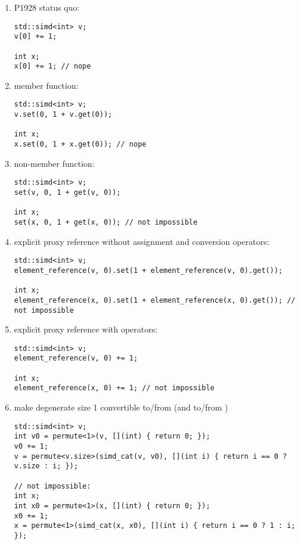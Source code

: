 \begin{enumerate}
  \item P1928 status quo:\label{explP1928}
\medskip\begin{lstlisting}[style=Vc]
std::simd<int> v;
v[0] += 1;

int x;
x[0] += 1; // nope
\end{lstlisting}

\item {} member function:\label{memberset}
\medskip\begin{lstlisting}[style=Vc]
std::simd<int> v;
v.set(0, 1 + v.get(0));

int x;
x.set(0, 1 + x.get(0)); // nope
\end{lstlisting}

\item {} non-member function:\label{nonmemberset}
\medskip\begin{lstlisting}[style=Vc]
std::simd<int> v;
set(v, 0, 1 + get(v, 0));

int x;
set(x, 0, 1 + get(x, 0)); // not impossible
\end{lstlisting}

\item explicit proxy reference without assignment and conversion operators:\label{proxyset}
\medskip\begin{lstlisting}[style=Vc]
std::simd<int> v;
element_reference(v, 0).set(1 + element_reference(v, 0).get());

int x;
element_reference(x, 0).set(1 + element_reference(x, 0).get()); // not impossible
\end{lstlisting}

\item explicit proxy reference with operators:\label{proxyoperators}
\medskip\begin{lstlisting}[style=Vc]
std::simd<int> v;
element_reference(v, 0) += 1;

int x;
element_reference(x, 0) += 1; // not impossible
\end{lstlisting}

\item make degenerate size 1 \simdT convertible to/from  (and \mask to/from )
  \medskip\begin{lstlisting}[style=Vc]
std::simd<int> v;
int v0 = permute<1>(v, [](int) { return 0; });
v0 += 1;
v = permute<v.size>(simd_cat(v, v0), [](int i) { return i == 0 ? v.size : i; });

// not impossible:
int x;
int x0 = permute<1>(x, [](int) { return 0; });
x0 += 1;
x = permute<1>(simd_cat(x, x0), [](int i) { return i == 0 ? 1 : i; });
  \end{lstlisting}

\end{enumerate}

